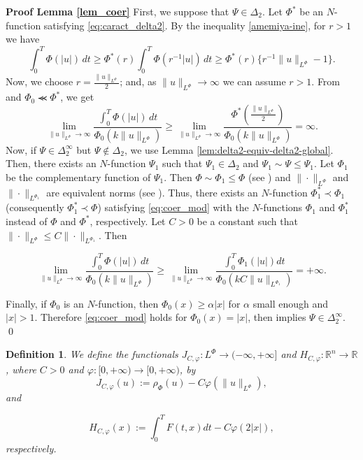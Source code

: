 \documentclass[twoside]{elsarticle}
\newtheorem{defi}[thm]{Definition}
\theoremstyle{remark}
\newcommand{\orlnor}{\|_{L^{\Phi}}}
\newcommand{\lphi}{L^{\Phi}}
\newcommand{\rr}{\mathbb{R}}
\renewcommand{\leq}{\leqslant}
\renewcommand{\geq}{\geqslant}
\begin{document}
\noindent\textbf{Proof Lemma \ref{lem_coer}} First, we suppose that $\Psi \in \Delta_2$. 
Let $\Phi^*$ be an $N$-function satisfying \eqref{eq:caract_delta2}. 
By the inequality \eqref{amemiya-ine}, for $r>1$ we have
\[
\int_0^T \Phi(|u|)\,dt\geq
\Phi^*(r) \int_0^T \Phi(r^{-1}|u|)\,dt\geq
\Phi^*(r)\{r^{-1}\|u\orlnor-1\}.
\]
Now, we choose $r=\frac{\|u\orlnor}{2}$; and, as $\|u\orlnor\to\infty$ we can assume $r>1$. 
From \cite[Thm. 2 (b)(v), p. 16]{rao1991theory} and $\Phi_0\llcurly \Phi^*$,  we get
\begin{equation}\label{eq:caso-delta-2}
\lim\limits_{\|u\orlnor \to \infty} \frac{\int_0^T \Phi(|u|)\,dt}{\Phi_0(k\|u\orlnor)}\geq
\lim\limits_{\|u\orlnor \to \infty} \frac{\Phi^*\left(\frac{\|u\orlnor}{2}\right)}{\Phi_0(k\|u\orlnor)}
=\infty.
\end{equation}
Now, if $\Psi\in\Delta_2^{\infty}$ but $\Psi\notin\Delta_2$, we  use Lemma \ref{lem:delta2-equiv-delta2-global}. 
Then, there exists an $N$-function $\Psi_1$ such that $\Psi_1\in\Delta_2$ and  $\Psi_1\sim\Psi\leq \Psi_1$. 
Let $\Phi_1$ be the complementary function of $\Psi_1$. Then $\Phi\sim\Phi_1\leq \Phi$ (see \cite[Thm. 3.1]{KR}) and $\|\cdot\orlnor$ and $\|\cdot\|_{L^{\Phi_1}}$ are equivalent norms  (see \cite[Thm. 13.2 and Thm. 13.3]{KR}). 
Thus, there exists an $N$-function $\Phi_1^*\prec \Phi_1$ (consequently $\Phi_1^*\prec \Phi$) 
satisfying  \eqref{eq:coer_mod}
with the $N$-functions $\Phi_1$ and $\Phi_1^*$ instead of $\Phi$ and $\Phi^*$, respectively.
Let $C>0$ be a constant such that  $\|\cdot\orlnor\leq C\|\cdot\|_{L^{\Phi_1}}$. Then

\[\lim\limits_{\|u\orlnor \to \infty}\frac{\int_0^T \Phi(|u|)\,dt}{\Phi_0(k\|u\orlnor)}\geq \lim\limits_{\|u\orlnor \to \infty} \frac{\int_0^T \Phi_1(|u|)dt}{\Phi_0(kC\|u\|_{L^{\Phi_1}})}=+\infty.\]


Finally, if $\Phi_0$ is an $N$-function, then $\Phi_0(x)\geq \alpha |x|$ for  $\alpha$ small enough and $|x|>1$.
Therefore \eqref{eq:coer_mod} holds for $\Phi_0(x)=|x|$, then \cite[Lemma 5.2]{ABGMS2015}  
implies  $\Psi\in\Delta_2^{\infty}$. \qed









\begin{defi}We define the  functionals $J_{C,\varphi}:\lphi\to (-\infty,+\infty]$ and $  H_{C,\varphi}:\rr^n\to \rr$, where $C>0$ and $\varphi:[0,+\infty)\to [0,+\infty)$, by
\begin{equation}\label{func_phi}
  J_{C,\varphi}(u):= \rho_{\Phi}\left(u\right)-C\varphi\left(\|u\orlnor\right),
\end{equation}
 and

\begin{equation}\label{eq:functional_H-bis}
 H_{C,\varphi}(x):=\int_0^TF(t,x)dt-C\varphi(2|x|),
\end{equation}
respectively.
\end{defi}
\end{document}

